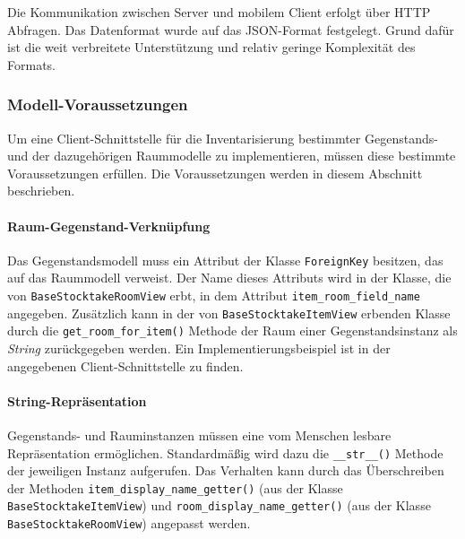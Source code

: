 Die Kommunikation zwischen Server und mobilem Client erfolgt über HTTP
Abfragen. Das Datenformat wurde auf das JSON-Format
\cite{json-format-doku} festgelegt. Grund dafür ist die weit verbreitete
Unterstützung und relativ geringe Komplexität des Formats.

\hypertarget{modell-voraussetzungen}{%
\subsubsection{Modell-Voraussetzungen}\label{modell-voraussetzungen}}

Um eine Client-Schnittstelle für die Inventarisierung bestimmter
Gegenstands- und der dazugehörigen Raummodelle zu implementieren, müssen
diese bestimmte Voraussetzungen erfüllen. Die Voraussetzungen werden in
diesem Abschnitt beschrieben.

\hypertarget{raum-gegenstand-verknuxfcpfung}{%
\paragraph{Raum-Gegenstand-Verknüpfung}\label{raum-gegenstand-verknuxfcpfung}}

Das Gegenstandsmodell muss ein Attribut der Klasse \texttt{ForeignKey}
besitzen, das auf das Raummodell verweist. Der Name dieses Attributs
wird in der Klasse, die von \texttt{BaseStocktakeRoomView} erbt, in dem
Attribut \texttt{item\_room\_field\_name} angegeben. Zusätzlich kann in
der von \texttt{BaseStocktakeItemView} erbenden Klasse durch die
\texttt{get\_room\_for\_item()} Methode der Raum einer
Gegenstandsinstanz als \emph{String}
 zurückgegeben
werden. Ein Implementierungsbeispiel ist in der \oa{} angegebenen
Client-Schnittstelle zu finden.

\hypertarget{string-repruxe4sentation}{%
\paragraph{String-Repräsentation}\label{string-repruxe4sentation}}

Gegenstands- und Rauminstanzen müssen eine vom Menschen lesbare
Repräsentation ermöglichen. Standardmäßig wird dazu die
\texttt{\_\_str\_\_()} Methode der jeweiligen Instanz aufgerufen. Das
Verhalten kann durch das Überschreiben der Methoden
\texttt{item\_display\_name\_getter()} (aus der Klasse
\texttt{BaseStocktakeItemView}) und
\texttt{room\_display\_name\_getter()} (aus der Klasse
\texttt{BaseStocktakeRoomView}) angepasst werden.

